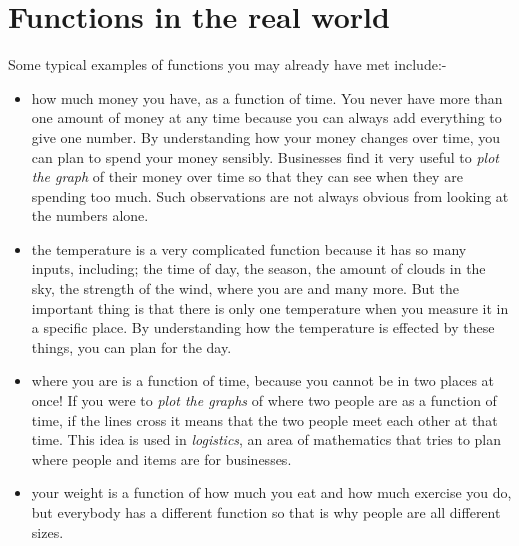 \section{ Functions in the real world}
\nopagebreak
\label{m39337*id232071}Some typical examples of functions you may already have met
include:-\par 
\label{m39337*id232074
}\begin{itemize}[noitemsep]
\label{m39337*uid1}\item how much money you have, as a function of time. You never have more than one amount of money at any time because you can always add everything to give one number. By understanding how your money changes over time, you can plan to spend your money sensibly. Businesses find it very useful to \textsl{plot the graph} of their money over time so that they can see when they are spending too much. Such observations are not always obvious from looking at the numbers alone.
\label{m39337*uid2}\item the temperature is a very complicated function because it has so many inputs, including; the time of day, the season, the amount of clouds in the sky, the strength of the wind, where you are and many more. But the important thing is that there is only one temperature when you measure it in a specific place. By understanding how the temperature is effected by these things, you can plan
for the day.
\label{m39337*uid3}\item where you are is a function of time, because you cannot be in two places at once! If you were to \textsl{plot the graphs} of where two people are as a function of time, if the lines cross it means that the two people meet each other at that time. This idea is used in \textsl{logistics}, an area of mathematics that tries to plan where people and items are for businesses.
\label{m39337*uid4}\item your weight is a function of how much you eat and how much exercise you do, but everybody has a different function so that is why people are all different sizes.
\end{itemize}
\label{m39337*cid4}
